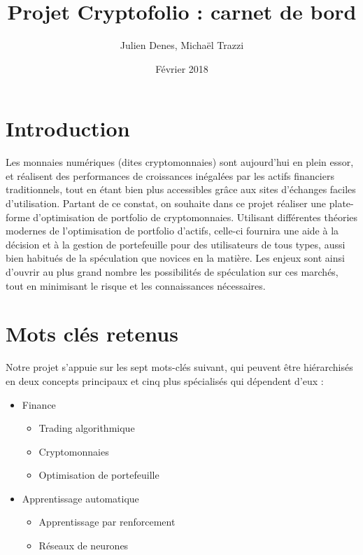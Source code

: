 \documentclass[a4paper]{article}
\title{Projet Cryptofolio : carnet de bord}
\author[]{Julien Denes, Michaël Trazzi}
\affil[]{Faculté des Sciences et Ingénierie -- Sorbonne Université}
\date{Février 2018}
\begin{document}
\maketitle

\section{Introduction}

Les monnaies numériques (dites cryptomonnaies) sont aujourd'hui en plein essor, et réalisent des performances de croissances inégalées par les actifs financiers traditionnels, tout en étant bien plus accessibles grâce aux sites d'échanges faciles d'utilisation. Partant de ce constat, on souhaite dans ce projet réaliser une plate-forme d’optimisation de portfolio de cryptomonnaies. Utilisant différentes théories modernes de l'optimisation de portfolio d'actifs, celle-ci fournira une aide à la décision et à la gestion de portefeuille pour des utilisateurs de tous types, aussi bien habitués de la spéculation que novices en la matière. Les enjeux sont ainsi d'ouvrir au plus grand nombre les possibilités de spéculation sur ces marchés, tout en minimisant le risque et les connaissances nécessaires.

\section{Mots clés retenus}

Notre projet s'appuie sur les sept mots-clés suivant, qui peuvent être hiérarchisés en deux concepts principaux et cinq plus spécialisés qui dépendent d'eux :

\begin{itemize}
    \item Finance
    \begin{itemize}
        \item Trading algorithmique
        \item Cryptomonnaies
        \item Optimisation de portefeuille
    \end{itemize}
    \item Apprentissage automatique
    \begin{itemize}
        \item Apprentissage par renforcement
        \item Réseaux de neurones
    \end{itemize}
\end{itemize}
\end{document}
